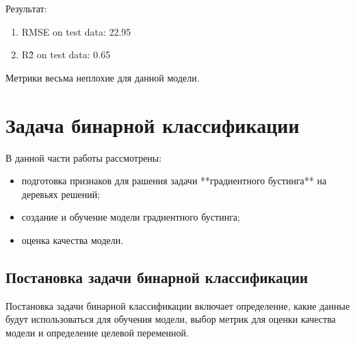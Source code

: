 Результат: 
\begin{enumerate}
\item RMSE on test data: 22.95
\item R\^2 on test data: 0.65
\end{enumerate}
Метрики весьма неплохие для данной модели.

\vspace{\baselineskip}\section{Задача бинарной классификации}

\par В данной части работы рассмотрены:
\begin{itemize}
\item подготовка признаков для рашения задачи **градиентного бустинга** на деревьях решений;
\item создание и обучение модели градиентного бустинга;
\item оценка качества модели.
\end{itemize}

\subsection{Постановка задачи бинарной классификации}\vspace{\baselineskip}

\par Постановка задачи бинарной классификации включает определение, какие данные будут использоваться для обучения модели, выбор метрик для оценки качества модели и определение целевой переменной.

